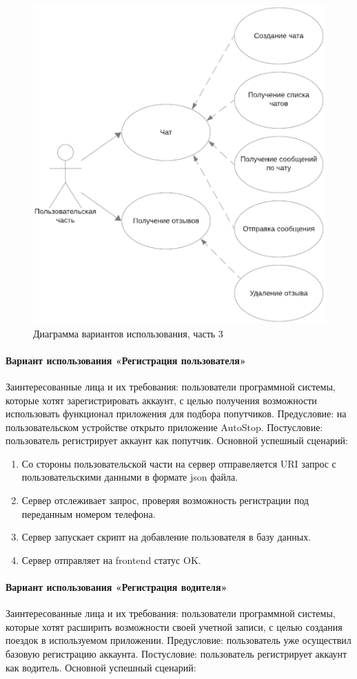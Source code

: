 \begin{figure}[H]
	\centering
	\includegraphics[width=0.7\linewidth]{images/Precedent3}
	\caption{Диаграмма вариантов использования, часть 3}
	\label{fig:precedent3}
\end{figure}

\paragraph{Вариант использования «Регистрация пользователя»}
Заинтересованные лица и их требования: пользователи программной системы, которые хотят зарегистрировать аккаунт, с целью получения возможности использовать функционал приложения для подбора попутчиков. Предусловие: на пользовательском устройстве открыто приложение AutoStop. Постусловие: пользователь регистрирует аккаунт как попутчик.
Основной успешный сценарий:

\begin{enumerate}
	\item Со стороны пользовательской части на сервер отправеляется URI запрос с пользовательскими данными в формате json файла.
	\item Сервер отслеживает запрос, проверяя возможность регистрации под переданным номером телефона.
	\item Сервер запускает скрипт на добавление пользователя в базу данных.
	\item Сервер отправляет на frontend статус OK.
\end{enumerate}

\paragraph{Вариант использования «Регистрация водителя»}
Заинтересованные лица и их требования: пользователи программной системы, которые хотят расширить возможности своей учетной записи, с целью создания поездок в используемом приложении. Предусловие: пользователь уже осуществил базовую регистрацию аккаунта. Постусловие: пользователь регистрирует аккаунт как водитель.
Основной успешный сценарий:

